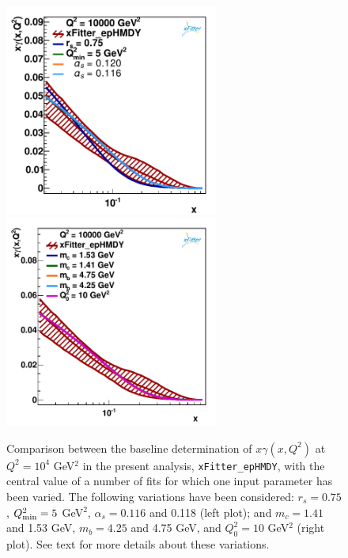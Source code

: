 \begin{figure}[t]
\centering
\includegraphics[width=7cm]{figs/q2_10000_pdf_ph_model_1}
\includegraphics[width=7cm]{figs/q2_10000_pdf_ph_model_2}
\caption{Comparison between the baseline determination of
  $x\gamma(x,Q^2)$ at $Q^2=10^4$ GeV$^2$ in the present
  analysis, {\tt xFitter\_epHMDY},
  with the central value of a number of fits for which one input parameter has been varied.
  The following variations have been considered: $r_s=0.75$, $Q^2_{\rm min}=5$ GeV$^2$, $\alpha_s=0.116$ and
  0.118 (left plot); and
  $m_c=1.41$ and 1.53 GeV, $m_b=4.25$ and 4.75 GeV, and $Q_0^2=10$ GeV$^2$ (right plot).
  See text for more details about these variations.
}
\label{fig:model}
\end{figure}

